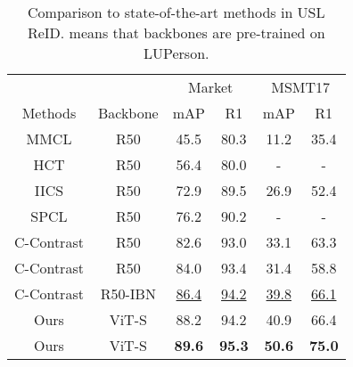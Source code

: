 \documentclass[10pt,twocolumn,letterpaper]{article}
\begin{document}
\begin{table}[tb]\small
    \begin{center}\begin{tabular}{cc|cc|cc}
    \hline
     &  & \multicolumn{2}{c|}{Market} & \multicolumn{2}{c}{MSMT17}\\
    Methods &Backbone & mAP & R1 & mAP & R1\\
    \hline
    MMCL \cite{MMCL} &R50 & 45.5 & 80.3 &11.2 & 35.4\\
    HCT \cite{HCT} & R50 & 56.4 & 80.0 & - & -\\ 
    IICS \cite{IICS} &R50 & 72.9 & 89.5 &26.9&52.4\\
    SPCL\cite{SPCL} & R50 &76.2 &90.2 &-&-\\
    C-Contrast \cite{dai2021cluster} & R50 &82.6 &93.0 &33.1 &63.3 \\
    C-Contrast \cite{dai2021cluster} & R50 &84.0 &93.4 &31.4 &58.8 \\
    C-Contrast \cite{dai2021cluster} & R50-IBN & \underline{86.4} & \underline{94.2} & \underline{39.8} & \underline{66.1}  \\
    \hline
    Ours & ViT-S&88.2 &94.2 &40.9 &66.4 \\
    Ours & ViT-S&\textbf{89.6} &\textbf{95.3} &\textbf{50.6}&\textbf{75.0 }\\
    \hline
    \end{tabular}\end{center}
    \vspace{-1em}
    \caption{\label{tab:sota2}Comparison to state-of-the-art methods in USL ReID.  means that backbones are pre-trained on LUPerson.}
\end{table}
\end{document}
